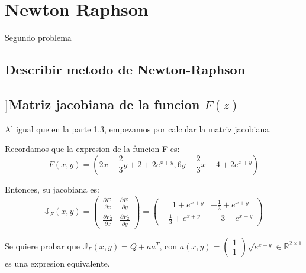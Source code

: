 \documentclass{article}
\begin{document}
    \section{Newton Raphson}
    Segundo problema

    \subsection{Describir metodo de Newton-Raphson}

    \subsection{]Matriz jacobiana de la funcion $F(z)$}
    Al igual que en la parte 1.3, empezamos por calcular la matriz jacobiana.
    
    Recordamos que la expresion de la funcion F es:
    \begin{equation*}
        F(x,y) = \left( 2x - \frac{2}{3}y + 2 + 2e^{x+y}, 6y - \frac{2}{3}x - 4 + 2e^{x+y} \right)
    \end{equation*}

    Entonces, su jacobiana es:
    \begin{equation}
        \mathbb{J}_F(x,y) =
        \begin{pmatrix}
            \frac{\partial F_1}{\partial x} & \frac{\partial F_1}{\partial y} \\
            \frac{\partial F_2}{\partial x} & \frac{\partial F_2}{\partial y}
        \end{pmatrix}
        =
        \begin{pmatrix}
            \phantom{-}1 + e^{x+y} & -\frac{1}{3} + e^{x+y} \\
            -\frac{1}{3} + e^{x+y} & \phantom{-}3 + e^{x+y}
        \end{pmatrix}
    \end{equation}

    Se quiere probar que $\mathbb{J}_F(x,y) = Q + aa^T$, con $a(x,y) = \begin{pmatrix} 1\\1 \end{pmatrix}\sqrt{e^{x+y}} \in \mathbb{R}^{2 \times 1}$
    es una expresion equivalente.
    
\end{document}
